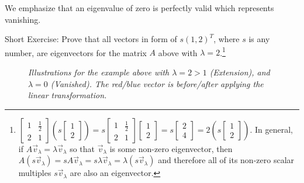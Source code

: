 We emphasize that an eigenvalue of zero is perfectly valid which represents vanishing. \par
Short Exercise: Prove that all vectors in form of $s(1,2)^T$, where $s$ is any number, are eigenvectors for the matrix $A$ above with $\lambda = 2$.\footnote{
$
\begin{bmatrix}
1 & \frac{1}{2} \\
2 & 1
\end{bmatrix}
\left(s
\begin{bmatrix}
1 \\
2 
\end{bmatrix}\right)
=
s\begin{bmatrix}
1 & \frac{1}{2} \\
2 & 1
\end{bmatrix}
\begin{bmatrix}
1 \\
2 
\end{bmatrix}
=
s
\begin{bmatrix}
2 \\
4
\end{bmatrix}
=
2\left(s
\begin{bmatrix}
1 \\
2 
\end{bmatrix}\right)
$. In general, if $A\vec{v}_\lambda = \lambda\vec{v}_\lambda$ so that $\vec{v}_\lambda$ is some non-zero eigenvector, then $A(s\vec{v}_\lambda) = sA\vec{v}_\lambda = s\lambda\vec{v}_\lambda = \lambda(s\vec{v}_\lambda)$ and therefore all of its non-zero scalar multiples $s\vec{v}_\lambda$ are also an eigenvector.}\par
\begin{figure}[h!]
\centering
{}
\caption{\textit{Illustrations for the example above with $\lambda = 2 > 1$ (Extension), and $\lambda = 0$ (Vanished). The red/blue vector is before/after applying the linear transformation.}}
\end{figure}
